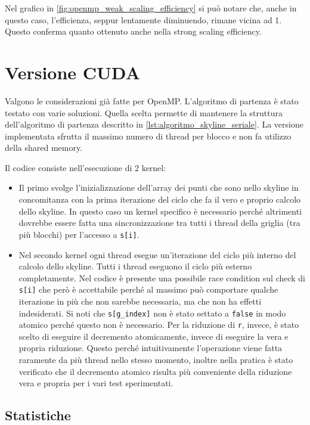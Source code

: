 \documentclass[11pt, a4paper]{article}
\begin{document}
Nel grafico in \autoref{fig:openmp_weak_scaling_efficiency} si può notare che, anche in questo caso, l'efficienza, seppur
lentamente diminuendo, rimane vicina ad 1. Questo conferma quanto ottenuto anche nella strong scaling efficiency.

\section{Versione CUDA}

Valgono le considerazioni già fatte per OpenMP.
L'algoritmo di partenza è stato testato con varie soluzioni.
Quella scelta permette di mantenere la struttura dell'algoritmo di partenza descritto in \autoref{lst:algoritmo_skyline_seriale}.
La versione implementata sfrutta il massimo numero di thread per blocco e non fa utilizzo della shared memory.

Il codice consiste nell'esecuzione di 2 kernel:

\begin{itemize}
  \item Il primo svolge l'inizializzazione dell'array dei punti che sono nello skyline in concomitanza con la prima iterazione
        del ciclo che fa il vero e proprio calcolo dello skyline.
        In questo caso un kernel specifico è necessario perché altrimenti dovrebbe essere fatta una sincronizzazione tra tutti i
        thread della griglia (tra più blocchi) per l'accesso a \texttt{s[i]}.
  \item Nel secondo kernel ogni thread esegue un'iterazione del ciclo più interno del calcolo dello skyline.
        Tutti i thread eseguono il ciclo più esterno completamente.
        Nel codice è presente una possibile race condition sul check di \texttt{s[i]} che però è accettabile perché al massimo può
        comportare qualche iterazione in più che non sarebbe necessaria, ma che non ha effetti indesiderati.
        Si noti che \texttt{s[g\_index]} non è stato settato a \texttt{false} in modo atomico perché questo non è necessario.
        Per la riduzione di \texttt{r}, invece, è stato scelto di eseguire il decremento atomicamente, invece di eseguire la vera
        e propria riduzione.
        Questo perché intuitivamente l'operazione viene fatta raramente da più thread nello stesso momento, inoltre nella pratica
        è stato verificato che il decremento atomico risulta più conveniente della riduzione vera e propria per i vari test
        sperimentati.
\end{itemize}

\subsection{Statistiche}
\end{document}
